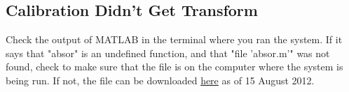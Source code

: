 \documentclass{article}
\begin{document}
\subsection{Calibration Didn't Get Transform}

Check the output of MATLAB in the terminal where you ran the system. If it says that "absor" is an undefined function, and that "file 'absor.m'" was not found, check to make sure that the file is on the computer where the system is being run. If not, the file can be downloaded \href{http://www.mathworks.com/matlabcentral/fileexchange/26186-absolute-orientation-horns-method}{here} as of 15 August 2012. 
\end{document}

